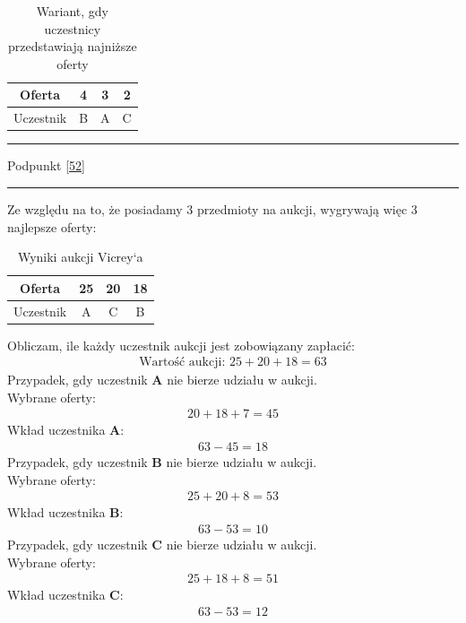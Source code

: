 \documentclass[
    12pt, %
]{../fphw}
\begin{document}
\begin{table}[H]
    \centering
    \begin{tabular}{ | c | c | c | c |}
        \hline
        Oferta    & 4 & 3 & 2 \\
        \hline
        Uczestnik & B & A & C \\
        \hline
    \end{tabular}
    \caption{Wariant, gdy uczestnicy przedstawiają najniższe oferty}
\end{table}

\par\noindent\rule{\textwidth}{0.4pt}
Podpunkt \ref{52}
\par\noindent\rule{\textwidth}{0.4pt}

Ze względu na to, że posiadamy 3 przedmioty na aukcji,
wygrywają więc 3 najlepsze oferty:
\begin{table}[H]
    \centering
    \begin{tabular}{ | c | c | c | c |}
        \hline
        Oferta    & 25 & 20 & 18 \\
        \hline
        Uczestnik & A  & C  & B  \\
        \hline
    \end{tabular}
    \caption{Wyniki aukcji Vicrey‘a}
\end{table}

Obliczam, ile każdy uczestnik aukcji jest zobowiązany zapłacić:
\begin{align*}
    \text{Wartość aukcji: } 25 + 20 + 18 = 63
\end{align*}
Przypadek, gdy uczestnik \textbf{A} nie bierze udziału w aukcji. \\
Wybrane oferty:
\begin{align*}
    20 + 18 + 7 = 45
\end{align*}
Wkład uczestnika \textbf{A}:
\begin{align*}
    63 - 45 = 18
\end{align*}
Przypadek, gdy uczestnik \textbf{B} nie bierze udziału w aukcji. \\
Wybrane oferty:
\begin{align*}
    25 + 20 + 8 = 53
\end{align*}
Wkład uczestnika \textbf{B}:
\begin{align*}
    63 - 53 = 10
\end{align*}
Przypadek, gdy uczestnik \textbf{C} nie bierze udziału w aukcji. \\
Wybrane oferty:
\begin{align*}
    25 + 18 + 8 = 51
\end{align*}
Wkład uczestnika \textbf{C}:
\begin{align*}
    63 - 53 = 12
\end{align*}
\end{document}
